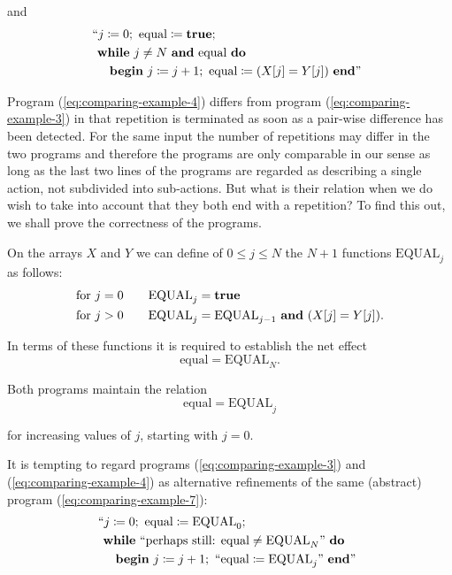\noindent
and
\begin{equation}
	\label{eq:comparing-example-4}
	\begin{split}
		&\text{\hspace{-.4em}``}j \coloneq 0;\text{ equal} \coloneq \text{\textbf{true}};\\
		&\text{\textbf{while} } j \neq N\text{ \textbf{and} equal \textbf{do}}\\
		&\quad\text{\textbf{begin} } j \coloneq  j + 1;\text{ equal} \coloneq (X[j] = Y[j]) \text{ \textbf{end}''}
	\end{split}
\end{equation}

Program (\ref{eq:comparing-example-4}) differs from program (\ref{eq:comparing-example-3}) in that repetition is terminated as soon as a pair-wise difference has been detected. For the same input the number of repetitions may differ in the two programs and therefore the programs are only comparable in our sense as long as the last two lines of the programs are regarded as describing a single action, not subdivided into sub-actions. But what is their relation when we do wish to take into account that they both end with a repetition? To find this out, we shall prove the correctness of the programs.

On the arrays $X$ and $Y$ we can define of $0 \leqslant j \leqslant N$ the $N + 1$ functions $\text{EQUAL}_j$ as follows:
\begin{equation}
	\label{eq:comparing-example-5}
	\begin{split}
		\text{for } j = 0\qquad & \text{EQUAL}_j = \text{\textbf{true}} \\
		\text{for } j > 0\qquad  & \text{EQUAL}_j = \text{EQUAL}_{j-1}\text{ \textbf{and} } (X[j] = Y[j]).
	\end{split}
\end{equation}

In terms of these functions it is required to establish the net effect
$$
\text{equal} = \text{EQUAL}_N.
$$

Both programs maintain the relation
\begin{equation}
	\text{equal} = \text{EQUAL}_j
\end{equation}

\noindent
for increasing values of $j$, starting with $j = 0$.

It is tempting to regard programs (\ref{eq:comparing-example-3}) and (\ref{eq:comparing-example-4}) as alternative refinements of the same (abstract) program (\ref{eq:comparing-example-7}):
\begin{equation}
	\label{eq:comparing-example-7}
	\begin{split}
		&\text{\hspace{-.4em}``}j \coloneq 0;\text{ equal} \coloneq \text{EQUAL}_0;\\
		&\text{\textbf{while} ``perhaps still: equal} \neq \text{EQUAL}_N\text{'' \textbf{do}}\\
		&\quad\text{\textbf{begin} } j \coloneq  j + 1;\text{ ``equal} \coloneq \text{EQUAL}_j\text{'' \textbf{end}''}
	\end{split}
\end{equation}

